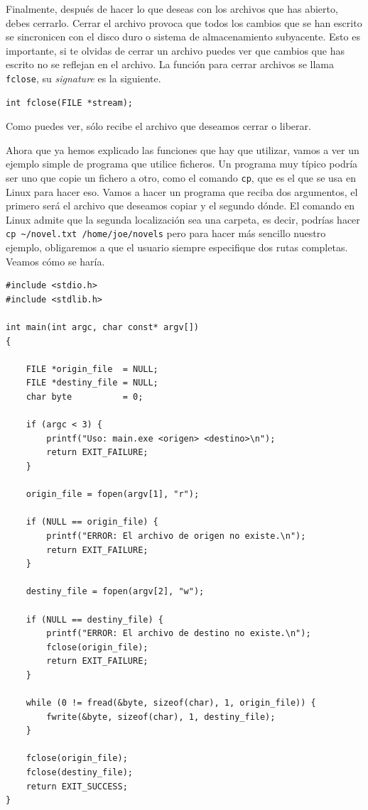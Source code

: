 \documentclass[a4paper]{article}
\begin{document}
Finalmente, después de hacer lo que deseas con los archivos que has abierto,
debes cerrarlo. Cerrar el archivo provoca que todos los cambios que se han
escrito se sincronicen con el disco duro o sistema de almacenamiento subyacente.
Esto es importante, si te olvidas de cerrar un archivo puedes ver que cambios
que has escrito no se reflejan en el archivo. La función para cerrar archivos
se llama \verb!fclose!, su \emph{signature} es la siguiente.

\noindent
\begin{minipage}[H]{\linewidth}
\mbox{}
\begin{lstlisting}[style=C,
caption={Declaración de la función \texttt{fclose}},
label={lst:fcloseSignature}]
int fclose(FILE *stream);
\end{lstlisting}
\end{minipage}
Como puedes ver, sólo recibe el archivo que deseamos cerrar o liberar.

Ahora que ya hemos explicado las funciones que hay que utilizar, vamos a ver
un ejemplo simple de programa que utilice ficheros. Un programa muy típico
podría ser uno que copie un fichero a otro, como el comando \verb!cp!, que es
el que se usa en Linux para hacer eso. Vamos a hacer un programa que reciba dos
argumentos, el primero será el archivo que deseamos copiar y el segundo dónde.
El comando en Linux admite que la segunda localización sea una carpeta, es
decir, podrías hacer \verb!cp ~/novel.txt /home/joe/novels! pero para hacer
más sencillo nuestro ejemplo, obligaremos a que el usuario siempre especifique
dos rutas completas. Veamos cómo se haría.

\noindent
\begin{minipage}[H]{\linewidth}
\mbox{}
\begin{lstlisting}[style=C,
caption={Ejemplo de manejos de ficheros},
label={lst:fileBasic}]
#include <stdio.h>
#include <stdlib.h>

int main(int argc, char const* argv[])
{

    FILE *origin_file  = NULL;
    FILE *destiny_file = NULL;
    char byte          = 0;

    if (argc < 3) {
        printf("Uso: main.exe <origen> <destino>\n");
        return EXIT_FAILURE;
    }

    origin_file = fopen(argv[1], "r");

    if (NULL == origin_file) {
        printf("ERROR: El archivo de origen no existe.\n");
        return EXIT_FAILURE;
    }

    destiny_file = fopen(argv[2], "w");

    if (NULL == destiny_file) {
        printf("ERROR: El archivo de destino no existe.\n");
        fclose(origin_file);
        return EXIT_FAILURE;
    }

    while (0 != fread(&byte, sizeof(char), 1, origin_file)) {
        fwrite(&byte, sizeof(char), 1, destiny_file);
    }

    fclose(origin_file);
    fclose(destiny_file);
    return EXIT_SUCCESS;
}

\end{lstlisting}
\end{minipage}
\end{document}
